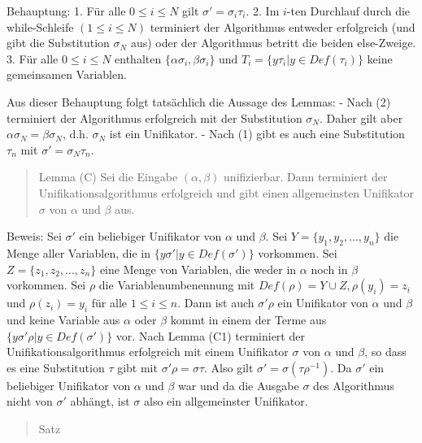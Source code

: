 \documentclass[a4paper]{article}
\begin{document}
\begin{multicols}{3}
  Behauptung: 1. Für alle $0\leq i\leq N$ gilt $\sigma'=\sigma_i\tau_i$.
  2. Im $i$-ten Durchlauf durch die while-Schleife $(1\leq i\leq N)$
  terminiert der Algorithmus entweder erfolgreich (und gibt die
  Substitution $\sigma_N$ aus) oder der Algorithmus betritt die beiden
  else-Zweige. 3. Für alle $0\leq i\leq N$ enthalten
  $\{\alpha\sigma_i,\beta\sigma_i\}$ und $T_i=\{y\tau_i|y\in Def(\tau_i)\}$
  keine gemeinsamen Variablen.

  Aus dieser Behauptung folgt tatsächlich die Aussage des Lemmas: - Nach
  (2) terminiert der Algorithmus erfolgreich mit der Substitution
  $\sigma_N$. Daher gilt aber $\alpha\sigma_N=\beta\sigma_N$, d.h.
  $\sigma_N$ ist ein Unifikator. - Nach (1) gibt es auch eine Substitution
  $\tau_n$ mit $\sigma'=\sigma_N\tau_n$.

  \begin{quote}
    Lemma (C) Sei die Eingabe $(\alpha,\beta)$ unifizierbar. Dann terminiert
    der Unifikationsalgorithmus erfolgreich und gibt einen allgemeinsten
    Unifikator $\sigma$ von $\alpha$ und $\beta$ aus.
  \end{quote}

  Beweis: Sei $\sigma'$ ein beliebiger Unifikator von $\alpha$ und
  $\beta$. Sei $Y=\{y_1,y_2,... ,y_n\}$ die Menge aller Variablen, die in
  $\{y\sigma'|y\in Def(\sigma')\}$ vorkommen. Sei $Z=\{z_1,z_2,...,z_n\}$
  eine Menge von Variablen, die weder in $\alpha$ noch in $\beta$
  vorkommen. Sei $\rho$ die Variablenumbenennung mit
  $Def(\rho)=Y\cup Z,\rho(y_i) =z_i$ und $\rho(z_i)=y_i$ für alle
  $1\leq i\leq n$. Dann ist auch $\sigma'\rho$ ein Unifikator von $\alpha$
  und $\beta$ und keine Variable aus $\alpha$ oder $\beta$ kommt in einem
  der Terme aus $\{y\sigma'\rho|y\in Def(\sigma')\}$ vor. Nach Lemma (C1)
  terminiert der Unifikationsalgorithmus erfolgreich mit einem Unifikator
  $\sigma$ von $\alpha$ und $\beta$, so dass es eine Substitution $\tau$
  gibt mit $\sigma'\rho=\sigma\tau$. Also gilt
  $\sigma'=\sigma(\tau\rho^{-1})$. Da $\sigma'$ ein beliebiger Unifikator
  von $\alpha$ und $\beta$ war und da die Ausgabe $\sigma$ des Algorithmus
  nicht von $\sigma'$ abhängt, ist $\sigma$ also ein allgemeinster
  Unifikator.

  \begin{quote}
    Satz


\end{quote}
\end{multicols}
\end{document}
